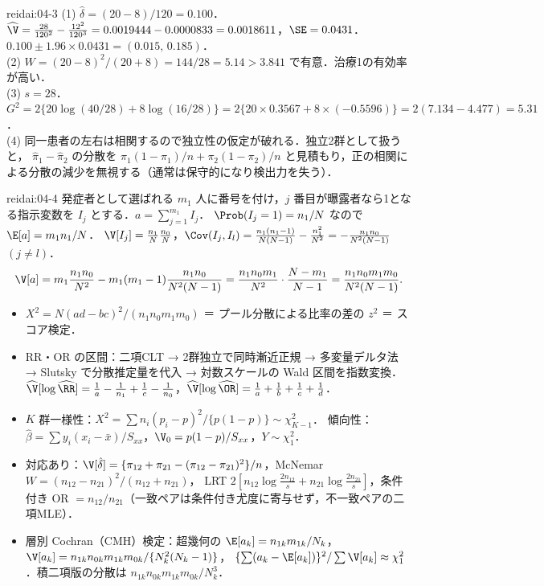 \begin{kaitou}{reidai:04-3}
(1) $\hat\delta=(20-8)/120=0.100$．
$\widehat\V=\frac{28}{120^2}-\frac{12^2}{120^3}=0.0019444-0.0000833=0.0018611$，$\SE=0.0431$．
$0.100\pm1.96\times0.0431=(0.015,\,0.185)$．\\
(2) $W=(20-8)^2/(20+8)=144/28=5.14>3.841$ で有意．治療1の有効率が高い．\\
(3) $s=28$．$G^2=2\{20\log(40/28)+8\log(16/28)\}=2\{20\times0.3567+8\times(-0.5596)\}=2(7.134-4.477)=5.31$．\\
(4) 同一患者の左右は相関するので独立性の仮定が破れる．独立2群として扱うと，
$\hat\pi_1-\hat\pi_2$ の分散を $\pi_1(1-\pi_1)/n+\pi_2(1-\pi_2)/n$ と見積もり，正の相関による分散の減少を無視する（通常は保守的になり検出力を失う）．
\end{kaitou}

\begin{kaitou}{reidai:04-4}
発症者として選ばれる $m_1$ 人に番号を付け，$j$ 番目が曝露者なら1となる指示変数を $I_j$ とする．$a=\sum_{j=1}^{m_1}I_j$．
$\Prob(I_j=1)=n_1/N$ なので $\E[a]=m_1n_1/N$．
$\V[I_j]=\frac{n_1}{N}\frac{n_0}{N}$，$\Cov(I_j,I_l)=\frac{n_1(n_1-1)}{N(N-1)}-\frac{n_1^2}{N^2}=-\frac{n_1n_0}{N^2(N-1)}$ $(j\ne l)$．
\[
\V[a]=m_1\frac{n_1n_0}{N^2}-m_1(m_1-1)\frac{n_1n_0}{N^2(N-1)}=\frac{n_1n_0m_1}{N^2}\cdot\frac{N-m_1}{N-1}=\frac{n_1n_0m_1m_0}{N^2(N-1)}.
\]
\end{kaitou}

\begin{summarybox}
\begin{itemize}
\item $X^2=N(ad-bc)^2/(n_1n_0m_1m_0)$ ＝ プール分散による比率の差の $z^2$ ＝ スコア検定．
\item RR・OR の区間：二項CLT → 2群独立で同時漸近正規 → 多変量デルタ法 → Slutsky で分散推定量を代入 → 対数スケールの Wald 区間を指数変換．
      $\widehat\V[\log\widehat{\RR}]=\frac1a-\frac1{n_1}+\frac1c-\frac1{n_0}$，$\widehat\V[\log\widehat{\OR}]=\frac1a+\frac1b+\frac1c+\frac1d$．
\item $K$ 群一様性：$X^2=\sum n_i(p_i-p)^2/\{p(1-p)\}\sim\chi^2_{K-1}$．
      傾向性：$\hat\beta=\sum y_i(x_i-\bar x)/S_{xx}$，$\V_0=p(1-p)/S_{xx}$，$Y\sim\chi^2_1$．
\item 対応あり：$\V[\hat\delta]=\{\pi_{12}+\pi_{21}-(\pi_{12}-\pi_{21})^2\}/n$，McNemar $W=(n_{12}-n_{21})^2/(n_{12}+n_{21})$，
      LRT $2[n_{12}\log\frac{2n_{12}}{s}+n_{21}\log\frac{2n_{21}}{s}]$，条件付き OR $=n_{12}/n_{21}$（一致ペアは条件付き尤度に寄与せず，不一致ペアの二項MLE）．
\item 層別 Cochran（CMH）検定：超幾何の $\E[a_k]=n_{1k}m_{1k}/N_k$，$\V[a_k]=n_{1k}n_{0k}m_{1k}m_{0k}/\{N_k^2(N_k-1)\}$，
      $\{\sum(a_k-\E[a_k])\}^2/\sum\V[a_k]\approx\chi^2_1$．積二項版の分散は $n_{1k}n_{0k}m_{1k}m_{0k}/N_k^3$．
\end{itemize}
\end{summarybox}
